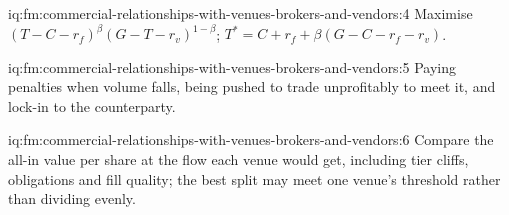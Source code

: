 \begin{solution}{iq:fm:commercial-relationships-with-venues-brokers-and-vendors:4}
Maximise $(T-C-r_f)^\beta(G-T-r_v)^{1-\beta}$; $T^*=C+r_f+\beta(G-C-r_f-r_v)$.
\end{solution}

\begin{solution}{iq:fm:commercial-relationships-with-venues-brokers-and-vendors:5}
Paying penalties when volume falls, being pushed to trade unprofitably to meet it, and lock-in to the counterparty.
\end{solution}

\begin{solution}{iq:fm:commercial-relationships-with-venues-brokers-and-vendors:6}
Compare the all-in value per share at the flow each venue would get, including tier cliffs, obligations and fill quality; the best split may meet
one venue's threshold rather than dividing evenly.
\end{solution}
